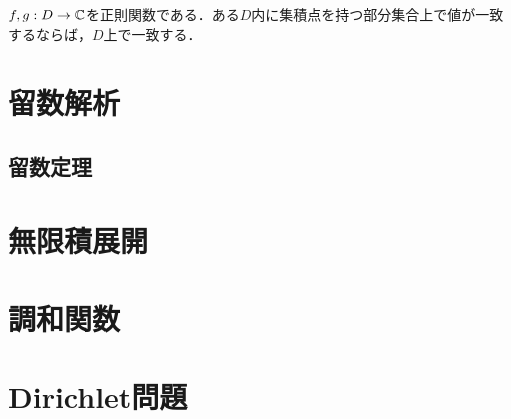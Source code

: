 \documentclass[uplatex, dvipdfmx]{jsreport}
\begin{document}
\begin{corollary}[一致の定理]
    $f,g:D\to\mathbb{C}$を正則関数である．ある$D$内に集積点を持つ部分集合上で値が一致するならば，$D$上で一致する．
\end{corollary}

\chapter{留数解析}

\section{留数定理}

\chapter{無限積展開}

\chapter{調和関数}

\chapter{Dirichlet問題}
\end{document}

